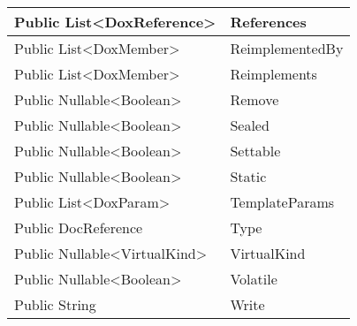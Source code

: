 \documentclass[11pt, oneside, a4paper]{book}
\begin{document}
\begin{center}
\begin{tabular}{| p{3cm} | p{12cm} | }
\hline
 Public  List<DoxReference> &  References\hypertarget{SoftwareEngineeringTools.{}Documentation.{}DoxMember.{}References}{}\\
\hline
 Public  List<DoxMember> &  ReimplementedBy\hypertarget{SoftwareEngineeringTools.{}Documentation.{}DoxMember.{}ReimplementedBy}{}\\
\hline
 Public  List<DoxMember> &  Reimplements\hypertarget{SoftwareEngineeringTools.{}Documentation.{}DoxMember.{}Reimplements}{}\\
\hline
 Public  Nullable<Boolean> &  Remove\hypertarget{SoftwareEngineeringTools.{}Documentation.{}DoxMember.{}Remove}{}\\
\hline
 Public  Nullable<Boolean> &  Sealed\hypertarget{SoftwareEngineeringTools.{}Documentation.{}DoxMember.{}Sealed}{}\\
\hline
 Public  Nullable<Boolean> &  Settable\hypertarget{SoftwareEngineeringTools.{}Documentation.{}DoxMember.{}Settable}{}\\
\hline
 Public  Nullable<Boolean> &  Static\hypertarget{SoftwareEngineeringTools.{}Documentation.{}DoxMember.{}Static}{}\\
\hline
 Public  List<DoxParam> &  TemplateParams\hypertarget{SoftwareEngineeringTools.{}Documentation.{}DoxMember.{}TemplateParams}{}\\
\hline
 Public  DocReference &  Type\hypertarget{SoftwareEngineeringTools.{}Documentation.{}DoxMember.{}Type}{}\\
\hline
 Public  Nullable<VirtualKind> &  VirtualKind\hypertarget{SoftwareEngineeringTools.{}Documentation.{}DoxMember.{}VirtualKind}{}\\
\hline
 Public  Nullable<Boolean> &  Volatile\hypertarget{SoftwareEngineeringTools.{}Documentation.{}DoxMember.{}Volatile}{}\\
\hline
 Public  String &  Write\hypertarget{SoftwareEngineeringTools.{}Documentation.{}DoxMember.{}Write}{}\\
\hline
\end{tabular}
\end{center}
\end{document}
